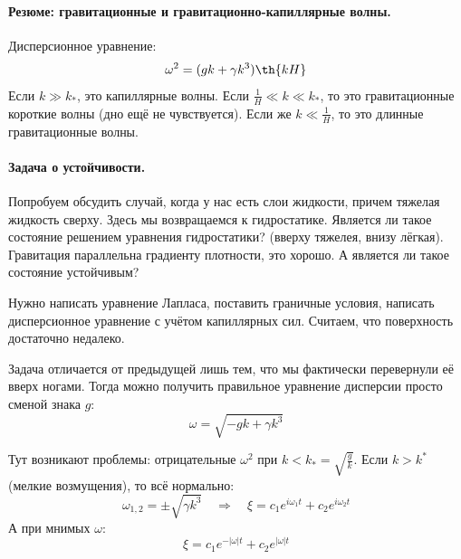 \paragraph{Резюме: гравитационные и гравитационно-капиллярные волны.}
Дисперсионное уравнение:
\begin{equation}
    \omega^2 = (gk+\gamma k^3)\th{kH}
\end{equation}
Если $k \gg k_*$, это капиллярные волны. 
Если $\frac{1}{H} \ll k \ll k_*$, то это гравитационные короткие волны (дно ещё не чувствуется).
Если же $k \ll \frac{1}{H}$, то это длинные гравитационные волны.


\paragraph{Задача о устойчивости.} Попробуем обсудить случай, когда у нас есть слои жидкости, причем тяжелая жидкость сверху. 
Здесь мы возвращаемся к гидростатике.
Является ли такое состояние решением уравнения гидростатики? (вверху тяжелея, внизу лёгкая).
Гравитация параллельна градиенту плотности, это хорошо. 
А является ли такое состояние устойчивым? 

Нужно написать уравнение Лапласа, поставить граничные условия, написать дисперсионное уравнение с учётом капиллярных сил. 
Считаем, что поверхность достаточно недалеко.

Задача отличается от предыдущей лишь тем, что мы фактически перевернули её вверх ногами. Тогда можно получить правильное  уравнение дисперсии просто сменой знака $g$:
\begin{equation}
    \omega = \sqrt{-gk+\gamma k^3}
\end{equation}


Тут возникают проблемы: отрицательные $\omega^2$ при $k < k_* = \sqrt{\frac{g}{k}}$. Если $k>k^*$ (мелкие возмущения), то всё нормально:
\begin{equation}
    \omega_{1,2} = \pm\sqrt{\gamma k^3}
    \quad \Rightarrow \quad
    \xi = c_1e^{i\omega_1 t}+c_2e^{i\omega_2 t}
\end{equation}
А при мнимых $\omega$:
\begin{equation}
    \xi = c_1e^{-|\omega|t}+c_2e^{|\omega|t}
\end{equation}

